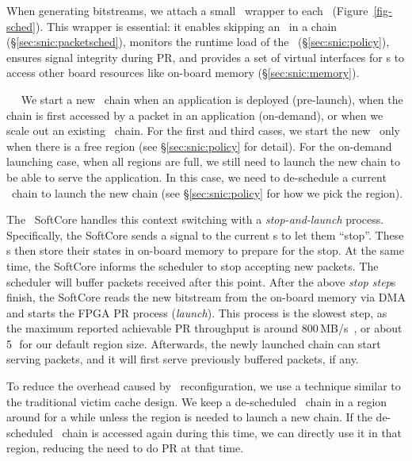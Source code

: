 When generating bitstreams, we attach a small \snic\ wrapper to each \nt\ (Figure~\ref{fig-sched}).
This wrapper is essential: it enables skipping an \nt\ in a chain (\S\ref{sec:snic:packetsched}), monitors the runtime load of the \nt\ (\S\ref{sec:snic:policy}), ensures signal integrity during PR, and provides a set of virtual interfaces for \nt{}s to access other board resources like on-board memory (\S\ref{sec:snic:memory}).

~~
We start a new \nt\ chain when an application is deployed (pre-launch), when the chain is first accessed by a packet in an application (on-demand), or when we scale out an existing \nt\ chain. For the first and third cases, we start the new \nt\ only when there is a free region (see \S\ref{sec:snic:policy} for detail).
For the on-demand launching case, when all regions are full, we still need to launch the new chain to be able to serve the application. In this case, we need to de-schedule a current \nt\ chain to launch the new chain (see \S\ref{sec:snic:policy} for how we pick the region).

The \snic\ SoftCore handles this context switching with a {\em stop-and-launch} process.
Specifically, the SoftCore sends a signal to the current \nt{}s to let them ``stop''.
These \nt{}s then store their states in on-board memory to prepare for the stop.
At the same time, the SoftCore informs the scheduler to stop accepting new packets. 
The scheduler will buffer packets received after this point.
After the above {\em stop step}s finish, the SoftCore reads the new bitstream from the on-board memory via DMA and starts the FPGA PR process ({\em launch}).
This process is the slowest step, as the maximum reported achievable PR throughput is around 800\,MB/s~\cite{coyote-osdi20}, or about 5\,\ms\ for our default region size.
Afterwards, the newly launched chain can start serving packets, and it will first serve previously buffered packets, if any.


To reduce the overhead caused by \nt\ reconfiguration, we use a technique similar to the traditional victim cache design. We keep a de-scheduled \nt\ chain in a region around for a while unless the region is needed to launch a new chain. If the de-scheduled \nt\ chain is accessed again during this time, we can directly use it in that region, reducing the need to do PR at that time.

